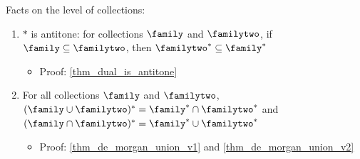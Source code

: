 Facts on the level of collections:
\begin{enumerate}
    \item $*$ is antitone: for collections $\family$ and $\familytwo$, if $\family \subseteq \familytwo$, then $\familytwo^* \subseteq \family^*$
    \begin{itemize}
        \item Proof: \cref{thm_dual_is_antitone}
    \end{itemize}

    \item For all collections $\family$ and $\familytwo$, $(\family \cup \familytwo)^* = \family^* \cap \familytwo^*$ and $(\family \cap \familytwo)^* = \family^* \cup \familytwo^*$
    \begin{itemize}
        \item Proof: \cref{thm_de_morgan_union_v1} and \cref{thm_de_morgan_union_v2}
    \end{itemize}
\end{enumerate}

\vskip0.5cm


